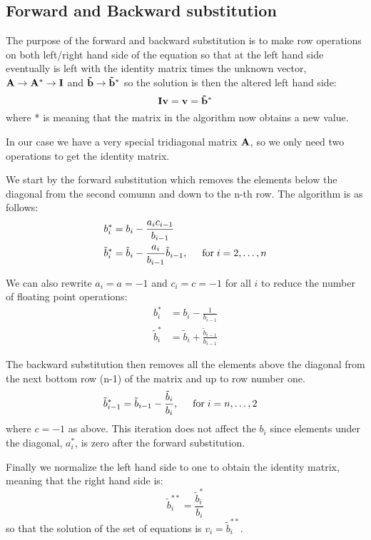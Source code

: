 \documentclass[11pt,a4wide]{article}
\begin{document}
\subsection{Forward and Backward substitution}
The purpose of the forward and backward substitution is to make row operations on both left/right hand side of the equation so that at the left hand side eventually is left with the identity matrix times the unknown vector, ${\bf A} \rightarrow {\bf A}^* \rightarrow {\bf I}$ and ${\bf \tilde{b}} \rightarrow {\bf \tilde{b}}^*$ so the solution is then the altered left hand side:
\[
{\bf I}{\bf v} = {\bf v} = {\bf \tilde{b}}^*
\]
where * is meaning that the matrix in the algorithm now obtains a new value.

In our case we have a very special tridiagonal matrix ${\bf A}$, so we only need two operations to get the identity matrix. 

We start by the forward substitution which removes the elements below the diagonal from the second comumn and down to the n-th row. The algorithm is as follows:
\begin{align*}
b_i^* &= b_i - \frac{a_i c_{i-1}}{b_{i-1}}\\
\tilde{b}_i^* &= \tilde{b}_i - \frac{a_i}{b_{i-1}}\tilde{b}_{i-1}, \hspace{0.5cm} \mathrm{for} \hspace{0.1cm} i=2,\dots,n
\end{align*}

We can also rewrite $a_i = a = -1$ and $c_i = c = -1$ for all $i$ to reduce the number of floating point operations:
\begin{align*}
b_i^* &= b_i - \frac{1}{b_{i-1}}\\
\tilde{b}_i^* &= \tilde{b}_i + \frac{\tilde{b}_{i-1}}{b_{i-1}}
\end{align*}

The backward substitution then removes all the elements above the diagonal from the next bottom row (n-1) of the matrix and up to row number one.
\begin{align*}
\tilde{b}_{i-1}^* &= \tilde{b}_{i-1} - \frac{\tilde{b}_{i}}{b_{i}}, \hspace{0.5cm} \mathrm{for} \hspace{0.1cm} i=n,\dots,2
\end{align*}
where $c= -1$ as above. This iteration does not affect the $b_i$ since elements under the diagonal, $a_i^*$, is zero after the forward substitution. 

Finally we normalize the left hand side to one to obtain the identity matrix, meaning that the right hand side is:
\[
\tilde{b}_i^{**} = \frac{\tilde{b}_i^*}{b_i}
\]
so that the solution of the set of equations is $v_i = \tilde{b}_i^{**}$. 
\end{document}

